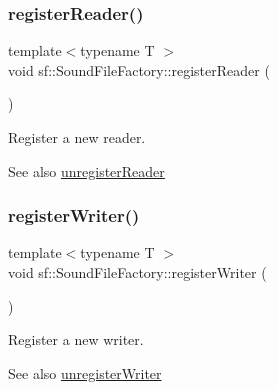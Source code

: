 \subsubsection{\texorpdfstring{registerReader()}{registerReader()}}
{\footnotesize\ttfamily template$<$typename T $>$ \\
void sf\+::\+Sound\+File\+Factory\+::register\+Reader (\begin{DoxyParamCaption}{ }\end{DoxyParamCaption})\hspace{0.3cm}{\ttfamily [static]}}



Register a new reader. 

\begin{DoxySeeAlso}{See also}
\mbox{\hyperlink{classsf_1_1_sound_file_factory_a9e6765c41e2784bc755388afb4a2f432}{unregister\+Reader}} \begin{DoxyVerb}\end{DoxyVerb}
 
\end{DoxySeeAlso}
\mbox{\label{classsf_1_1_sound_file_factory_a3a59140e6ccf1f252f721b790eddd661}} 
\subsubsection{\texorpdfstring{registerWriter()}{registerWriter()}}
{\footnotesize\ttfamily template$<$typename T $>$ \\
void sf\+::\+Sound\+File\+Factory\+::register\+Writer (\begin{DoxyParamCaption}{ }\end{DoxyParamCaption})\hspace{0.3cm}{\ttfamily [static]}}



Register a new writer. 

\begin{DoxySeeAlso}{See also}
\mbox{\hyperlink{classsf_1_1_sound_file_factory_a2306f90d1f72e474732e4bcceeb34215}{unregister\+Writer}} \begin{DoxyVerb}\end{DoxyVerb}
 
\end{DoxySeeAlso}
\mbox{\label{classsf_1_1_sound_file_factory_a9e6765c41e2784bc755388afb4a2f432}} 
